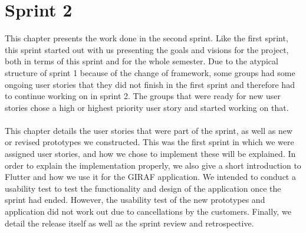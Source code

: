 \chapter{Sprint 2}
This chapter presents the work done in the second sprint.
Like the first sprint, this sprint started out with us presenting the goals and visions for the project, both in terms of this sprint and for the whole semester.
Due to the atypical structure of sprint 1 because of the change of framework, some groups had some ongoing user stories that they did not finish in the first sprint and therefore had to continue working on in sprint 2.
The groups that were ready for new user stories chose a high or highest priority user story and started working on that.
\\\\
This chapter details the user stories that were part of the sprint, as well as new or revised prototypes we constructed.
This was the first sprint in which we were assigned user stories, and how we chose to implement these will be explained.
In order to explain the implementation properly, we also give a short introduction to Flutter and how we use it for the GIRAF application.
We intended to conduct a usability test to test the functionality and design of the application once the sprint had ended.
However, the usability test of the new prototypes and application did not work out due to cancellations by the customers. 
Finally, we detail the release itself as well as the sprint review and retrospective.
